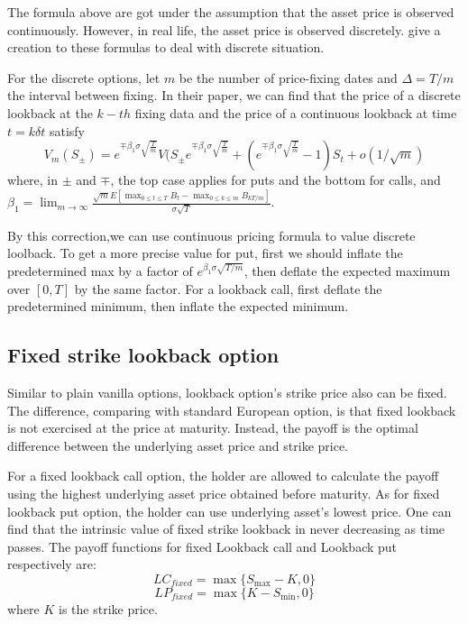 \documentclass[12pt,oneside,titlepage]{book}
\begin{document}
The formula above are got under the assumption that the asset price is observed continuously. However, in real life, the asset price is observed discretely. \cite{Broadie1999} give a creation to these formulas to deal with discrete situation.

For the discrete options, let $m$ be the number of price-fixing dates and $\Delta = T/m$ the interval between fixing. In their paper, we can find that the price of a discrete lookback at the $k-th$ fixing data and the price of a continuous lookback at time $t = k \delta t$ satisfy
\begin{equation}\label{eq:7}
V_m (S_\pm)
=
e^{\mp\beta_1 \sigma \sqrt{\frac{T}{m}}}
V(S_{\pm}e^{\mp\beta _1 \sigma \sqrt{\frac{T}{m}}} +
(e^{\mp \beta_1 \sigma \sqrt{\frac{T}{m}}} -1)S_t + o(1/\sqrt{m})
\end{equation}
where, in $\pm$ and $\mp$, the top case applies for puts and the bottom for calls, and $\beta_1 = \lim_{m\to\infty} \frac{\sqrt{m}E[\max_{0\leq t \leq T} B_t - \max_{0\leq k \leq m} B_{kT/m}]}{\sigma \sqrt{T}}$.

By this correction,we can use continuous pricing formula
to value discrete loolback. To get a more precise value for put,
first we should inflate the predetermined max by a factor of
$e^{\beta_1 \sigma \sqrt{T/m}}$,
then deflate the expected maximum over $[0,T]$ by the same factor. For a lookback call, first deflate the predetermined minimum, then inflate the expected minimum.




\subsection{Fixed strike lookback option}
Similar to plain vanilla options, lookback option's strike price also can be fixed. The difference, comparing with standard European option, is that fixed lookback is not exercised at the price at maturity.  Instead, the payoff is the optimal difference between the underlying asset price and strike price. 

For a fixed lookback call option, the holder are allowed to calculate the payoff using the highest underlying asset price obtained before maturity. As for fixed lookback put option, the holder can use underlying asset's lowest price. One can find that the intrinsic value of fixed strike lookback in never decreasing as time passes. The payoff functions for fixed Lookback call and  Lookback put respectively are:
\begin{equation}
LC_{fixed} = \max\{S_{\max} - K, 0\} 
\end{equation}
\begin{equation}
LP_{fixed}= \max\{K-S_{\min},0\}
\end{equation}
where $K$ is the strike price.
\end{document}
